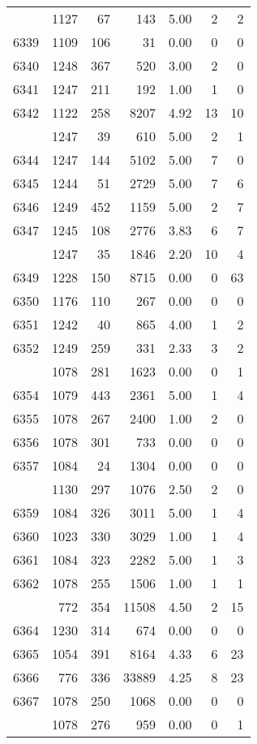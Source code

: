 \documentclass[
]{article}
\begin{document}
\begin{table}
\begin{tabular}[t]{lrrrrrr}
\addlinespace
6338 & 1127 & 67 & 143 & 5.00 & 2 & 2\\
6339 & 1109 & 106 & 31 & 0.00 & 0 & 0\\
6340 & 1248 & 367 & 520 & 3.00 & 2 & 0\\
6341 & 1247 & 211 & 192 & 1.00 & 1 & 0\\
6342 & 1122 & 258 & 8207 & 4.92 & 13 & 10\\
\addlinespace
6343 & 1247 & 39 & 610 & 5.00 & 2 & 1\\
6344 & 1247 & 144 & 5102 & 5.00 & 7 & 0\\
6345 & 1244 & 51 & 2729 & 5.00 & 7 & 6\\
6346 & 1249 & 452 & 1159 & 5.00 & 2 & 7\\
6347 & 1245 & 108 & 2776 & 3.83 & 6 & 7\\
\addlinespace
6348 & 1247 & 35 & 1846 & 2.20 & 10 & 4\\
6349 & 1228 & 150 & 8715 & 0.00 & 0 & 63\\
6350 & 1176 & 110 & 267 & 0.00 & 0 & 0\\
6351 & 1242 & 40 & 865 & 4.00 & 1 & 2\\
6352 & 1249 & 259 & 331 & 2.33 & 3 & 2\\
\addlinespace
6353 & 1078 & 281 & 1623 & 0.00 & 0 & 1\\
6354 & 1079 & 443 & 2361 & 5.00 & 1 & 4\\
6355 & 1078 & 267 & 2400 & 1.00 & 2 & 0\\
6356 & 1078 & 301 & 733 & 0.00 & 0 & 0\\
6357 & 1084 & 24 & 1304 & 0.00 & 0 & 0\\
\addlinespace
6358 & 1130 & 297 & 1076 & 2.50 & 2 & 0\\
6359 & 1084 & 326 & 3011 & 5.00 & 1 & 4\\
6360 & 1023 & 330 & 3029 & 1.00 & 1 & 4\\
6361 & 1084 & 323 & 2282 & 5.00 & 1 & 3\\
6362 & 1078 & 255 & 1506 & 1.00 & 1 & 1\\
\addlinespace
6363 & 772 & 354 & 11508 & 4.50 & 2 & 15\\
6364 & 1230 & 314 & 674 & 0.00 & 0 & 0\\
6365 & 1054 & 391 & 8164 & 4.33 & 6 & 23\\
6366 & 776 & 336 & 33889 & 4.25 & 8 & 23\\
6367 & 1078 & 250 & 1068 & 0.00 & 0 & 0\\
\addlinespace
6368 & 1078 & 276 & 959 & 0.00 & 0 & 1\\

\end{tabular}
\end{table}
\end{document}
